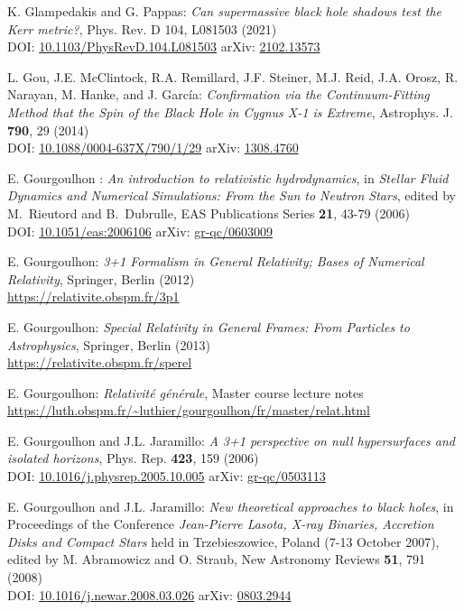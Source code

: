 \begin{thebibliography}{123}
K. Glampedakis and G. Pappas:
{\em Can supermassive black hole shadows test the Kerr metric?},
Phys. Rev. D 104, L081503 (2021)\\
DOI: \href{https://doi.org/10.1103/PhysRevD.104.L081503}{10.1103/PhysRevD.104.L081503}\hfill
arXiv: \href{https://arxiv.org/abs/2102.13573}{2102.13573}

L. Gou, J.E. McClintock, R.A. Remillard, J.F. Steiner, M.J. Reid, J.A. Orosz, R. Narayan, M. Hanke, and J. García:
{\em Confirmation via the Continuum-Fitting Method that the Spin of the Black Hole in Cygnus X-1 is Extreme},
Astrophys. J. {\bf 790}, 29 (2014)\\
DOI: \href{https://doi.org/10.1088/0004-637X/790/1/29}{10.1088/0004-637X/790/1/29}\hfill
arXiv: \href{https://arxiv.org/abs/1308.4760}{1308.4760}

E. Gourgoulhon :
{\em  An introduction to relativistic hydrodynamics},
in {\em Stellar Fluid Dynamics and Numerical Simulations: From the Sun
to Neutron Stars}, edited by M.~Rieutord and B.~Dubrulle,
EAS Publications Series {\bf 21}, 43-79 (2006) \\
DOI: \href{https://doi.org/10.1051/eas:2006106}{10.1051/eas:2006106}\hfill
arXiv: \href{https://arxiv.org/abs/gr-qc/0603009}{gr-qc/0603009}

E. Gourgoulhon:
{\em 3+1 Formalism in General Relativity; Bases of Numerical Relativity},
Springer, Berlin (2012)\\
\url{https://relativite.obspm.fr/3p1}

E. Gourgoulhon:
{\em Special Relativity in General Frames: From Particles to Astrophysics},
Springer, Berlin (2013) \\
\url{https://relativite.obspm.fr/sperel}

E. Gourgoulhon:
{\em Relativité générale},
Master course lecture notes\\
\url{https://luth.obspm.fr/~luthier/gourgoulhon/fr/master/relat.html}

E. Gourgoulhon and J.L. Jaramillo:
{\em A 3+1 perspective on null hypersurfaces and isolated horizons},
Phys. Rep. {\bf 423}, 159 (2006)\\
DOI: \href{https://doi.org/10.1016/j.physrep.2005.10.005}{10.1016/j.physrep.2005.10.005}\hfill
arXiv: \href{https://arxiv.org/abs/gr-qc/0503113}{gr-qc/0503113}

E. Gourgoulhon and J.L. Jaramillo:
{\em New theoretical approaches to black holes},
in Proceedings of the Conference {\em Jean-Pierre Lasota, X-ray Binaries, Accretion Disks and Compact Stars} held in Trzebieszowice, Poland (7-13 October 2007), edited by M. Abramowicz and O. Straub, New Astronomy Reviews {\bf 51}, 791 (2008) \\
DOI: \href{https://doi.org/10.1016/j.newar.2008.03.026}{10.1016/j.newar.2008.03.026}\hfill
arXiv: \href{https://arxiv.org/abs/0803.2944}{0803.2944}


\end{thebibliography}
